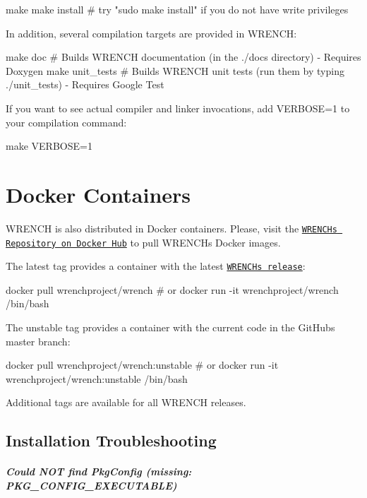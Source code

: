 \begin{DoxyCode}
make
make install # try "sudo make install" if you do not have write privileges
\end{DoxyCode}


In addition, several compilation targets are provided in W\+R\+E\+N\+CH\+:


\begin{DoxyCode}
make doc               # Builds WRENCH documentation (in the ./docs directory) - Requires Doxygen
make unit\_tests        # Builds WRENCH unit tests  (run them by typing ./unit\_tests) - Requires Google Test
\end{DoxyCode}


If you want to see actual compiler and linker invocations, add V\+E\+R\+B\+O\+SE=1 to your compilation command\+:


\begin{DoxyCode}
make VERBOSE=1
\end{DoxyCode}
\hypertarget{install_install-docker}{}\section{Docker Containers}\label{install_install-docker}
W\+R\+E\+N\+CH is also distributed in Docker containers. Please, visit the \href{https://hub.docker.com/r/wrenchproject/wrench/}{\tt W\+R\+E\+N\+CH\textquotesingle{}s Repository on Docker Hub} to pull W\+R\+E\+N\+CH\textquotesingle{}s Docker images.

The {\ttfamily latest} tag provides a container with the latest \href{https://github.com/wrench-project/wrench/releases}{\tt W\+R\+E\+N\+CH\textquotesingle{}s release}\+:


\begin{DoxyCode}
docker pull wrenchproject/wrench 
# or
docker run -it wrenchproject/wrench /bin/bash
\end{DoxyCode}


The {\ttfamily unstable} tag provides a container with the current code in the Git\+Hub\textquotesingle{}s {\ttfamily master} branch\+:


\begin{DoxyCode}
docker pull wrenchproject/wrench:unstable
# or
docker run -it wrenchproject/wrench:unstable /bin/bash
\end{DoxyCode}


Additional tags are available for all W\+R\+E\+N\+CH releases.\hypertarget{install_install-troubleshooting}{}\subsection{Installation Troubleshooting}\label{install_install-troubleshooting}
\subparagraph*{{\ttfamily Could N\+OT find Pkg\+Config (missing\+: P\+K\+G\+\_\+\+C\+O\+N\+F\+I\+G\+\_\+\+E\+X\+E\+C\+U\+T\+A\+B\+LE)}}


